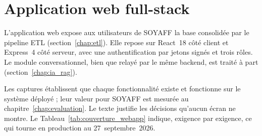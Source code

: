 \section{Application web full-stack}
\label{chap:webapp}

L'application web expose aux utilisateurs de SOYAFF la base consolidée par le pipeline ETL (section~\ref{chap:etl}). Elle repose sur React~18 côté client et Express~4 côté serveur, avec une authentification par jetons signés et trois rôles. Le module conversationnel, bien que relayé par le même backend, est traité à part (section~\ref{chap:ia_rag}).

Les captures établissent que chaque fonctionnalité existe et fonctionne sur le système déployé ; leur valeur pour SOYAFF est mesurée au chapitre~\ref{chap:evaluation}. Le texte justifie les décisions qu'aucun écran ne montre. Le Tableau~\ref{tab:couverture_webapp} indique, exigence par exigence, ce qui tourne en production au 27~septembre~2026.

